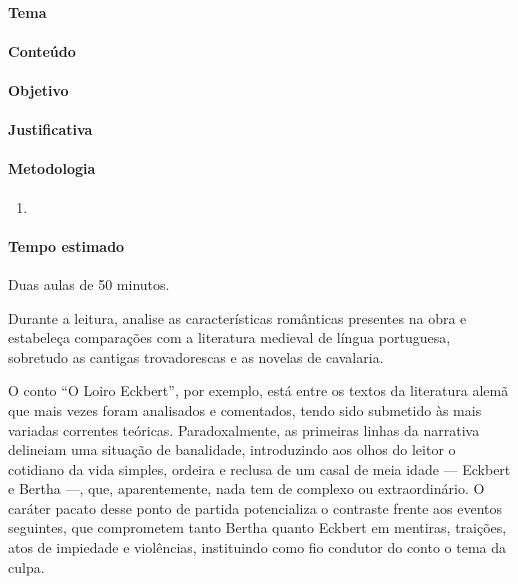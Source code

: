 \documentclass[11pt]{extarticle}
\begin{document}

\paragraph{Tema}

\paragraph{Conteúdo}

\paragraph{Objetivo}

\paragraph{Justificativa}

\paragraph{Metodologia}
\begin{enumerate}

\item 

\end{enumerate}

\paragraph{Tempo estimado} Duas aulas de 50 minutos. 

Durante a leitura, analise as características românticas
presentes na obra e estabeleça comparações com a literatura medieval de
língua portuguesa, sobretudo as cantigas trovadorescas e as novelas de
cavalaria.

O conto ``O Loiro Eckbert'', por exemplo, está entre os textos da
literatura alemã que mais vezes foram analisados e comentados, tendo
sido submetido às mais variadas correntes teóricas. Paradoxalmente, as
primeiras linhas da narrativa delineiam uma situação de banalidade,
introduzindo aos olhos do leitor o cotidiano da vida simples, ordeira e
reclusa de um casal de meia idade --- Eckbert e Bertha ---, que,
aparentemente, nada tem de complexo ou extraordinário. O caráter pacato
desse ponto de partida potencializa o contraste frente aos eventos
seguintes, que comprometem tanto Bertha quanto Eckbert em mentiras,
traições, atos de impiedade e violências, instituindo como fio condutor
do conto o tema da culpa.
\end{document}
